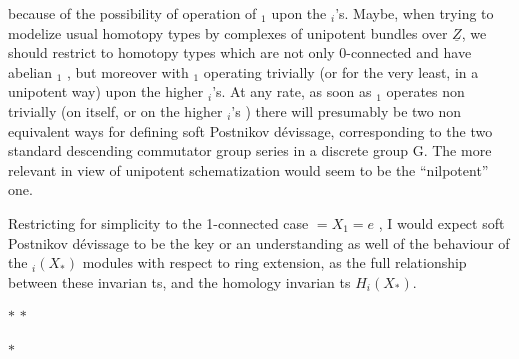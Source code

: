 
because of the possibility of operation of \hand{$\pi$}$_1$ upon the \hand{$\pi$}$_i$'s. Maybe,
when trying to modelize usual homotopy types by complexes of unipotent
bundles over $\underline{Z}$, we should restrict to homotopy types which are not only
0-connected and have abelian \hand{$\pi$}$_1$ , but moreover with \hand{$\pi$}$_1$ operating
trivially (or for the very least, in a unipotent way) upon the higher
\hand{$\pi$}$_i$'s. At any rate, as soon as \hand{$\pi$}$_1$ operates non trivially (on itself, or
on the higher \hand{$\pi$}$_i$'s ) there will presumably be two non equivalent ways for
defining soft Postnikov dévissage, corresponding to the two standard
descending commutator group series in a discrete group G. The more relevant
 in view of unipotent schematization would seem to be the ``nilpotent''
one.

Restricting for simplicity to the 1-connected case $=X_1=e$ , I would
expect soft Postnikov dévissage to be the key or an understanding as well
of the behaviour of the \hand{$\pi$}$_i(X_*)$ modules with respect to ring extension,
as  the full relationship between these invarian ts, and the homology
invarian ts $H_i(X_*)$.

$*$ \quad $*$

$*$

